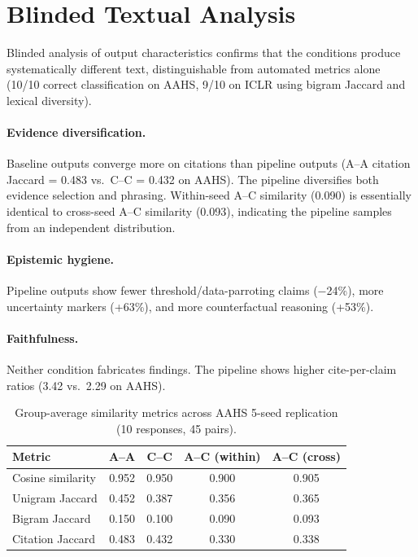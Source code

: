 \documentclass{article}
\begin{document}
\section{Blinded Textual Analysis}
\label{app:textual}

Blinded analysis of output characteristics confirms that the conditions produce systematically different text, distinguishable from automated metrics alone (10/10 correct classification on AAHS, 9/10 on ICLR using bigram Jaccard and lexical diversity).

\paragraph{Evidence diversification.} Baseline outputs converge more on citations than pipeline outputs (A--A citation Jaccard = 0.483 vs.\ C--C = 0.432 on AAHS). The pipeline diversifies both evidence selection and phrasing. Within-seed A--C similarity (0.090) is essentially identical to cross-seed A--C similarity (0.093), indicating the pipeline samples from an independent distribution.

\paragraph{Epistemic hygiene.} Pipeline outputs show fewer threshold/data-parroting claims ($-$24\%), more uncertainty markers (+63\%), and more counterfactual reasoning (+53\%).

\paragraph{Faithfulness.} Neither condition fabricates findings. The pipeline shows higher cite-per-claim ratios (3.42 vs.\ 2.29 on AAHS).

\begin{table}[h]
\caption{Group-average similarity metrics across AAHS 5-seed replication (10 responses, 45 pairs).}
\label{tab:similarity}
\begin{center}
\begin{tabular}{lcccc}
\toprule
\textbf{Metric} & \textbf{A--A} & \textbf{C--C} & \textbf{A--C (within)} & \textbf{A--C (cross)} \\
\midrule
Cosine similarity & 0.952 & 0.950 & 0.900 & 0.905 \\
Unigram Jaccard & 0.452 & 0.387 & 0.356 & 0.365 \\
Bigram Jaccard & 0.150 & 0.100 & 0.090 & 0.093 \\
Citation Jaccard & 0.483 & 0.432 & 0.330 & 0.338 \\
\bottomrule
\end{tabular}
\end{center}
\end{table}
\end{document}
